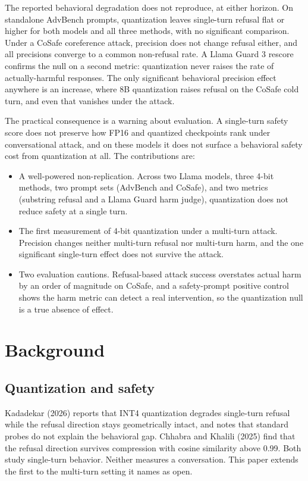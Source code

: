 \documentclass[11pt]{article}
\begin{document}
The reported behavioral degradation does not reproduce, at either horizon. On
standalone AdvBench prompts, quantization leaves single-turn refusal flat or
higher for both models and all three methods, with no significant comparison.
Under a CoSafe coreference attack, precision does not change refusal either, and
all precisions converge to a common non-refusal rate. A Llama Guard 3 rescore
confirms the null on a second metric: quantization never raises the rate of
actually-harmful responses. The only significant behavioral precision effect
anywhere is an increase, where 8B quantization raises refusal on the CoSafe cold
turn, and even that vanishes under the attack.

The practical consequence is a warning about evaluation. A single-turn safety
score does not preserve how FP16 and quantized checkpoints rank under
conversational attack, and on these models it does not surface a behavioral
safety cost from quantization at all. The contributions are:

\begin{itemize}
\itemsep2pt
\item A well-powered non-replication. Across two Llama models, three 4-bit
methods, two prompt sets (AdvBench and CoSafe), and two metrics (substring
refusal and a Llama Guard harm judge), quantization does not reduce safety at a
single turn.
\item The first measurement of 4-bit quantization under a multi-turn attack.
Precision changes neither multi-turn refusal nor multi-turn harm, and the one
significant single-turn effect does not survive the attack.
\item Two evaluation cautions. Refusal-based attack success overstates actual
harm by an order of magnitude on CoSafe, and a safety-prompt positive control
shows the harm metric can detect a real intervention, so the quantization null is
a true absence of effect.
\end{itemize}

\section{Background}

\subsection{Quantization and safety}
Kadadekar (2026) reports that INT4 quantization degrades single-turn refusal
while the refusal direction stays geometrically intact, and notes that standard
probes do not explain the behavioral gap. Chhabra and Khalili (2025) find that
the refusal direction survives compression with cosine similarity above 0.99.
Both study single-turn behavior. Neither measures a conversation. This paper
extends the first to the multi-turn setting it names as open.
\end{document}
